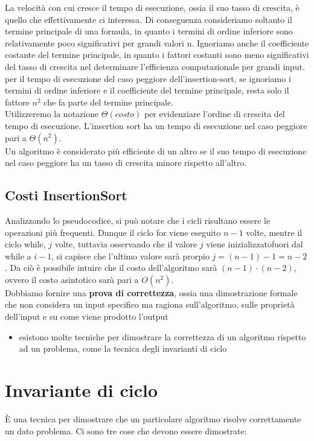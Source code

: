 \noindent La velocità con cui cresce il tempo di esecuzione, ossia il suo tasso di crescita, è quello che effettivamente ci interessa. Di conseguenza consideriamo soltanto il termine principale di una formula, in quanto i termini di ordine inferiore sono relativamente poco significativi per grandi valori n. Ignoriamo anche il coefficiente costante del termine principale, in quanto i fattori costanti sono meno significativi del tasso di crescita nel determinare l'efficienza computazionale per grandi input. per il tempo di esecuzione del caso peggiore dell'insertion-sort, se ignoriamo i termini di ordine inferiore e il coefficiente del termine principale, resta solo il fattore $n^2$ che fa parte del termine principale.\\
Utilizzeremo la notazione $\Theta(costo)$ per evidenziare l'ordine di crescita del tempo di esecuzione. L'insertion sort ha un tempo di esecuzione nel caso peggiore pari a $\Theta(n^2)$.\\
Un algoritmo è considerato più efficiente di un altro se il suo tempo di esecuzione nel caso peggiore ha un tasso di crescita minore rispetto all'altro.

\subsection{Costi InsertionSort}
Analizzando lo pseudocodice, si può notare che i cicli risultano essere le operazioni più frequenti. Dunque il ciclo for viene eseguito $n-1$ volte, mentre il ciclo while, $j$ volte, tuttavia osservando che il valore $j$ viene inizializzatofuori dal while a $i-1$, si capisce che l'ultimo valore sarà prorpio $j = (n-1)-1 = n-2$. Da ciò è possibile intuire che il  costo dell'algoritmo sarà $(n-1) \cdot (n-2)$, ovvero il costo asintotico sarà pari a $O(n^2)$.\\

\noindent Dobbiamo fornire una \textbf{prova di correttezza}, ossia una dimostrazione formale che non considera un input specifico ma ragiona sull'algoritmo, sulle proprietà dell'input e su come viene prodotto l'output

\begin{itemize}[label=--]
    \item esistono molte tecniche per dimostrare la correttezza di un algoritmo rispetto ad un problema, come la tecnica degli invarianti di ciclo
\end{itemize}

\noindent \section{Invariante di ciclo}
È una tecnica per dimostrare che un particolare algoritmo risolve correttamente un dato problema. Ci sono tre cose che devono essere dimostrate:

